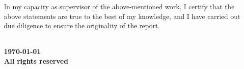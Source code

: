 \vspace{20mm}
 \qquad
\vspace{20mm}

\noindent In my capacity as supervisor of the above-mentioned work, I certify
that the above statements are true to the best of my knowledge, and
I have carried out due diligence to ensure the originality of the report.

\vspace{20mm}

 \qquad


\blankpage

\vspace*{\fill}
\begin{center}
\large\bf \textcopyright \ \myname\\
\large\bf \monthyeardate\today\\
\large\bf All rights reserved
\end{center}
\vspace*{\fill}
\thispagestyle{empty}


%


